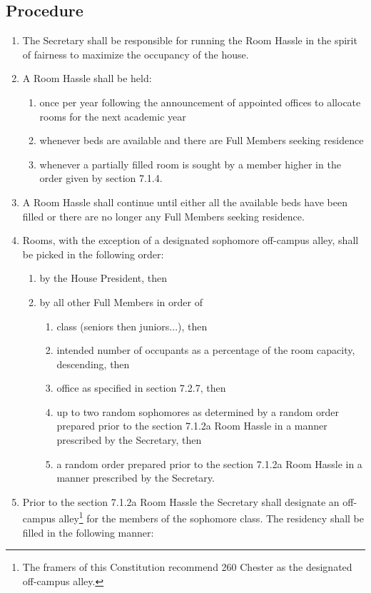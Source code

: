 \documentclass[10pt]{article} %
\begin{document}
\subsection{Procedure}
\begin{enumerate}
\item The Secretary shall be responsible for running the Room Hassle in the spirit of fairness to maximize the occupancy of the house.
\item A Room Hassle shall be held:
\begin{enumerate}
\item once per year following the announcement of appointed offices to allocate rooms for the next academic year
\item whenever beds are available and there are Full Members seeking residence
\item whenever a partially filled room is sought by a member higher in the order given by section 7.1.4.
\end{enumerate}
\item A Room Hassle shall continue until either all the available beds have been filled or there are no longer any Full Members seeking residence.
\item Rooms, with the exception of a designated sophomore off-campus alley, shall be picked in the following order:
\begin{enumerate}
\item by the House President, then
\item by all other Full Members in order of
\begin{enumerate}
\item class (seniors then juniors...), then
\item intended number of occupants as a percentage of the room capacity, descending, then
\item office as specified in section 7.2.7, then
\item up to two random sophomores as determined by a random order prepared prior to the section 7.1.2a Room Hassle in a manner prescribed by the Secretary, then
\item a random order prepared prior to the section 7.1.2a Room Hassle in a manner prescribed by
the Secretary.
\end{enumerate}
\end{enumerate}
\item Prior to the section 7.1.2a Room Hassle the Secretary shall designate an off-campus alley\footnote{The framers of this Constitution recommend 260 Chester as the designated off-campus alley.} for the members of the sophomore class. The residency shall be filled in the following manner:

\end{enumerate}
\end{document}

